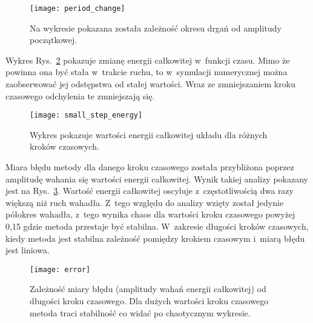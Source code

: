 \documentclass[a4paper; 12pt]{article}
\begin{document}
\begin{figure}[h]
    \centering
    \texttt{[image: period\_change]}
    \caption{Na wykresie pokazana została zależność okresu drgań od amplitudy początkowej.}
    \label{fig:periodchange}
\end{figure}

Wykres Rys.~\ref{fig:smallstepenergy} pokazuje zmianę energii całkowitej
w~funkcji czasu.
Mimo że powinna ona być stała w~trakcie ruchu, to w~symulacji numerycznej można
zaobserwować jej odstępstwa od stałej wartości.
Wraz ze zmniejszaniem kroku czasowego odchylenia te zmniejszają się.

\begin{figure}[h]
    \centering
    \texttt{[image: small\_step\_energy]}
    \caption{Wykres pokazuje wartości energii całkowitej układu dla różnych
        kroków czasowych.}
    \label{fig:smallstepenergy}
\end{figure}

Miara błędu metody dla danego kroku czasowego została przybliżona poprzez
amplitudę wahania się wartości energii całkowitej.
Wynik takiej analizy pokazany jest na Rys.~\ref{fig:error}.
Wartość energii całkowitej oscyluje z~częstotliwością dwa razy większą niż ruch
wahadła.
Z~tego względu do analizy wzięty został jedynie półokres wahadła, z~tego wynika
chaos dla wartości kroku czasowego powyżej 0,15 gdzie metoda przestaje być stabilna.
W~zakresie długości kroków czasowych, kiedy metoda jest stabilna zależność
pomiędzy krokiem czasowym i~miarą błędu jest liniowa.

\begin{figure}[h]
    \centering
    \texttt{[image: error]}
    \caption{Zależność miary błędu (amplitudy wahań energii całkowitej) od
        długości kroku czasowego.
        Dla dużych wartości kroku czasowego metoda traci stabilność co widać po
        chaotycznym wykresie.}
    \label{fig:error}
\end{figure}

\end{document}
